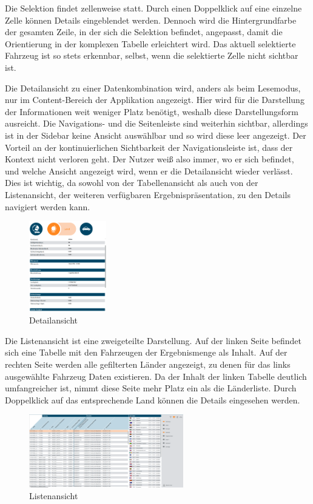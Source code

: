 Die Selektion findet zellenweise statt. Durch einen Doppelklick auf eine einzelne Zelle können Details eingeblendet werden. Dennoch wird die Hintergrundfarbe der gesamten Zeile, in der sich die Selektion befindet, angepasst, damit die Orientierung in der komplexen Tabelle erleichtert wird. Das aktuell selektierte Fahrzeug ist so stets erkennbar, selbst, wenn die selektierte Zelle nicht sichtbar ist.\par
Die Detailansicht zu einer Datenkombination wird, anders als beim Lesemodus, nur im Content-Bereich der Applikation angezeigt. Hier wird für die Darstellung der Informationen weit weniger Platz benötigt, weshalb diese Darstellungsform ausreicht. Die Navigations- und die Seitenleiste sind weiterhin sichtbar, allerdings ist in der Sidebar keine Ansicht auswählbar und so wird diese leer angezeigt. Der Vorteil an der kontinuierlichen Sichtbarkeit der Navigationsleiste ist, dass der Kontext nicht verloren geht. Der Nutzer weiß also immer, wo er sich befindet, und welche Ansicht angezeigt wird, wenn er die Detailansicht wieder verlässt. Dies ist wichtig, da sowohl von der Tabellenansicht als auch von der Listenansicht, der weiteren verfügbaren Ergebnispräsentation, zu den Details navigiert werden kann.\par
\begin{figure}[H]
 \centering
 \includegraphics[width=0.3\textwidth]{grafiken/ltue_details.png}
 \caption{Detailansicht}
 \label{fig:ltueDetails}
\end{figure}
Die Listenansicht ist eine zweigeteilte Darstellung. Auf der linken Seite befindet sich eine Tabelle mit den Fahrzeugen der Ergebnismenge als Inhalt. Auf der rechten Seite werden alle gefilterten Länder angezeigt, zu denen für das links ausgewählte Fahrzeug Daten existieren. Da der Inhalt der linken Tabelle deutlich umfangreicher ist, nimmt diese Seite mehr Platz ein als die Länderliste. Durch Doppelklick auf das entsprechende Land können die Details eingesehen werden.\par
\begin{figure}[H]
 \centering
 \includegraphics[width=0.6\textwidth]{grafiken/ltue_list.png}
 \caption{Listenansicht}
 \label{fig:ltueList}
\end{figure}
